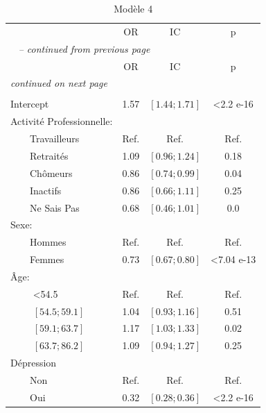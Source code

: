 \documentclass{book}
\begin{document}
\begin{longtable}{lccc}\caption{Modèle 4}\\
    \hline  
		& \multirow{2}{*}{OR} & \multirow{2}{*}{IC}& \multirow{2}{*}{p}\\ 
		 &    				    &    			    &                  \\ 
   \hline
    \hline     
    \endfirsthead 
    \multicolumn{4}{l}{\tablename\ \thetable{} \textit{-- continued from previous page}}\\ 
    \hline
		& \multirow{2}{*}{OR} & \multirow{2}{*}{IC}& \multirow{2}{*}{p}\\ 
		&    				    &    			    &                  \\ 
    \hline
    \hline  
    \endhead   
    \hline
    \multicolumn{4}{l}{\textit{continued on next page}} \\ 
    \endfoot   
    \multicolumn{4}{l}{}  \\ 
    \endlastfoot  
Intercept & 1.57 & $\left[1.44 ; 1.71 \right]$ & <2.2 e-16\\
Activité Professionnelle: &              &              &	\\ 
$\qquad$Travailleurs 		&		Ref.		& 	Ref.		&	Ref.\\ 
$\qquad$Retraités&1.09 &$\left[0.96 ; 1.24 \right]$ & 0.18\\ 
$\qquad$Chômeurs & 0.86& $\left[0.74 ; 0.99\right]$& 0.04\\ 
$\qquad$Inactifs  & 0.86& $\left[0.66 ; 1.11\right]$& 0.25\\ 
$\qquad$Ne Sais Pas & 0.68& $\left[0.46 ; 1.01\right]$ & 0.0 \\ 
Sexe: &              &              &                          \\ 
$\qquad$Hommes &Ref. & Ref.& Ref.\\ 
$\qquad$Femmes & 0.73& $\left[0.67 ; 0.80 \right]$ & <7.04 e-13\\
Âge: &&&\\
$\qquad$ <54.5 &Ref.&Ref.&Ref.\\
$\qquad$ $\left[54.5 ; 59.1 \right]$ &1.04& $\left[0.93 ; 1.16 \right]$& 0.51\\
$\qquad$ $\left[59.1 ; 63.7\right]$ &1.17&$\left[1.03 ; 1.33 \right]$& 0.02\\
$\qquad$ $\left[63.7 ; 86.2 \right]$&1.09&$\left[0.94 ; 1.27 \right]$&0.25\\
Dépression&&&\\
$\qquad$Non&Ref.&Ref.&Ref.\\
$\qquad$Oui&0.32& $\left[0.28 ; 0.36 \right]$ &<2.2 e-16\\
    \hline
    \end{longtable} 
\end{document}
